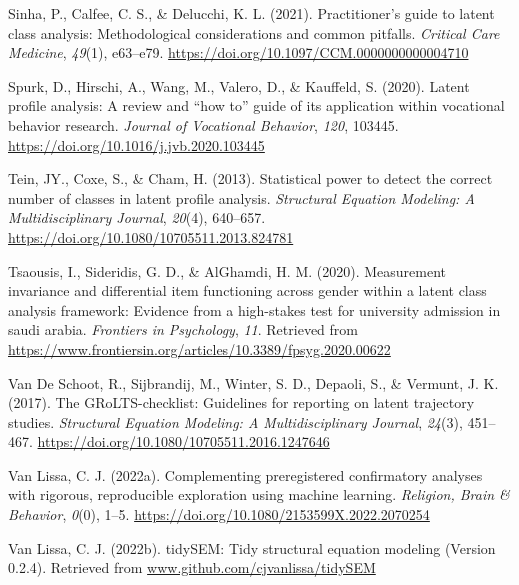 \documentclass[
  ,man,floatsintext]{apa6}
\newlength{\cslhangindent}
\newlength{\cslentryspacingunit} %
\newenvironment{CSLReferences}[2] %
 {%
  \setlength{\parindent}{0pt}
  \ifodd #1
  \let\oldpar\par
  \def\par{\hangindent=\cslhangindent\oldpar}
  \fi
  \setlength{\parskip}{#2\cslentryspacingunit}
 }%
 {}
\begin{document}
\begin{CSLReferences}{1}{0}
\leavevmode{}%
Sinha, P., Calfee, C. S., \& Delucchi, K. L. (2021). Practitioner's guide to latent class analysis: Methodological considerations and common pitfalls. \emph{Critical Care Medicine}, \emph{49}(1), e63--e79. \url{https://doi.org/10.1097/CCM.0000000000004710}

\leavevmode{}%
Spurk, D., Hirschi, A., Wang, M., Valero, D., \& Kauffeld, S. (2020). Latent profile analysis: A review and {``how to''} guide of its application within vocational behavior research. \emph{Journal of Vocational Behavior}, \emph{120}, 103445. \url{https://doi.org/10.1016/j.jvb.2020.103445}

\leavevmode{}%
Tein, JY., Coxe, S., \& Cham, H. (2013). Statistical power to detect the correct number of classes in latent profile analysis. \emph{Structural Equation Modeling: A Multidisciplinary Journal}, \emph{20}(4), 640--657. \url{https://doi.org/10.1080/10705511.2013.824781}

\leavevmode{}%
Tsaousis, I., Sideridis, G. D., \& AlGhamdi, H. M. (2020). Measurement invariance and differential item functioning across gender within a latent class analysis framework: Evidence from a high-stakes test for university admission in saudi arabia. \emph{Frontiers in Psychology}, \emph{11}. Retrieved from \url{https://www.frontiersin.org/articles/10.3389/fpsyg.2020.00622}

\leavevmode{}%
Van De Schoot, R., Sijbrandij, M., Winter, S. D., Depaoli, S., \& Vermunt, J. K. (2017). The {GRoLTS}-checklist: Guidelines for reporting on latent trajectory studies. \emph{Structural Equation Modeling: A Multidisciplinary Journal}, \emph{24}(3), 451--467. \url{https://doi.org/10.1080/10705511.2016.1247646}

\leavevmode{}%
Van Lissa, C. J. (2022a). Complementing preregistered confirmatory analyses with rigorous, reproducible exploration using machine learning. \emph{Religion, Brain \& Behavior}, \emph{0}(0), 1--5. \url{https://doi.org/10.1080/2153599X.2022.2070254}

\leavevmode{}%
Van Lissa, C. J. (2022b). {tidySEM}: Tidy structural equation modeling (Version 0.2.4). Retrieved from \href{https://www.github.com/cjvanlissa/tidySEM}{www.github.com/cjvanlissa/tidySEM}


\end{CSLReferences}
\end{document}

